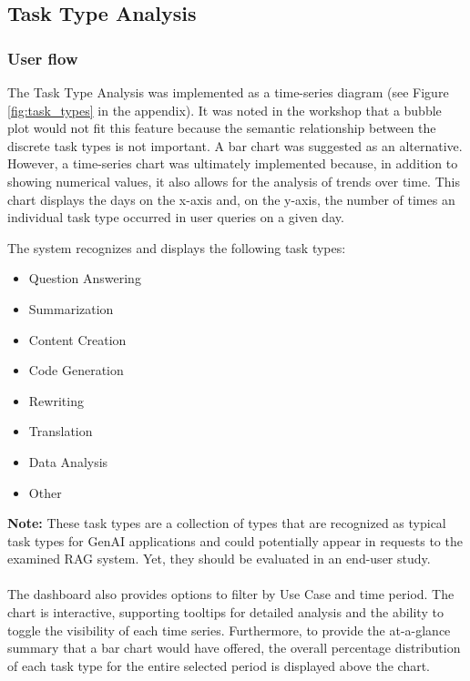 \documentclass[
	english,
	ruledheaders=section,%
	class=report,%
	thesis={type=bachelor},%
	accentcolor=1b,%
	custommargins=true,%
	marginpar=false,%
	parskip=half-,%
	fontsize=11pt,%
	DIV=14,
]{tudapub}
\begin{document}
\subsection{Task Type Analysis}
\subsubsection{User flow}
The Task Type Analysis was implemented as a time-series diagram (see Figure \ref{fig:task_types} in the appendix). It was noted in the workshop that a bubble plot would not fit this feature because the semantic relationship between the discrete task types is not important. A bar chart was suggested as an alternative. However, a time-series chart was ultimately implemented because, in addition to showing numerical values, it also allows for the analysis of trends over time. This chart displays the days on the x-axis and, on the y-axis, the number of times an individual task type occurred in user queries on a given day.

The system recognizes and displays the following task types:
\begin{itemize}
    \item Question Answering
    \item Summarization
    \item Content Creation
    \item Code Generation
    \item Rewriting
    \item Translation
    \item Data Analysis
    \item Other
\end{itemize}
\textbf{Note:} These task types are a collection of types that are recognized as typical task types for GenAI applications and could potentially appear in requests to the examined RAG system. Yet, they should be evaluated in an end-user study.\\
\\
The dashboard also provides options to filter by Use Case and time period. The chart is interactive, supporting tooltips for detailed analysis and the ability to toggle the visibility of each time series. Furthermore, to provide the at-a-glance summary that a bar chart would have offered, the overall percentage distribution of each task type for the entire selected period is displayed above the chart.
\end{document}
